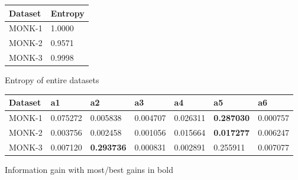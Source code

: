 \documentclass{article}
\begin{document}
\begin{figure}
	\centering
	\begin{tabular}{| l | l |}
		\hline
		Dataset & Entropy \\
		\hline
		\hline
		MONK-1 & 1.0000 \\
		MONK-2 & 0.9571 \\
		MONK-3 & 0.9998 \\
		\hline
	\end{tabular}
    \caption{Entropy of entire datasets}
\end{figure}

\begin{figure}
    \centering
    \begin{tabular}{| l | l | l | l | l | l | l |}
        \hline
        Dataset & a1 & a2 & a3 & a4 & a5 & a6 \\
        \hline
        \hline
        MONK-1 & 0.075272  & 0.005838  & 0.004707  & 0.026311  & \textbf{0.287030}  & 0.000757 \\
        MONK-2 & 0.003756  & 0.002458  & 0.001056  & 0.015664  & \textbf{0.017277} & 0.006247 \\
        MONK-3 & 0.007120  & \textbf{0.293736} & 0.000831  & 0.002891  & 0.255911  & 0.007077 \\
        \hline
    \end{tabular}
    \caption{Information gain with most/best gains in bold}
\end{figure}
\end{document}
